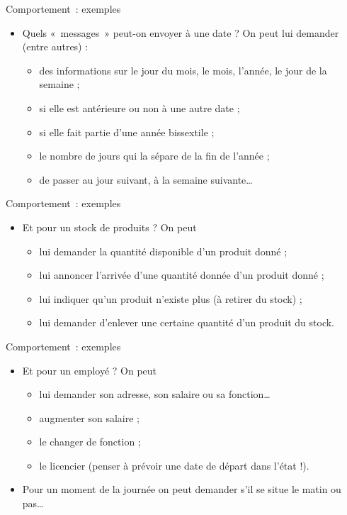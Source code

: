 \begin{frame}{Comportement~: exemples}
	\begin{itemize}
		\item
			Quels «~messages~» peut-on envoyer à une date ? 
			\pause
			On peut lui demander (entre autres) :
			\begin{itemize}
			\item
				des informations sur le jour du mois, le mois, l'année,
				le jour de la semaine ;
			\item
				si elle est antérieure ou non à une autre date ;
			\item
				si elle fait partie d'une année bissextile ;
			\item
				le nombre de jours qui la sépare de la fin de l'année ;
			\item 
				de passer au jour suivant, à la semaine suivante\dots
			\end{itemize}
	\end{itemize}
\end{frame}

\begin{frame}{Comportement~: exemples}
	\begin{itemize}
		\item 
			Et pour un stock de produits ? On peut 
			\pause
			\begin{itemize}
			\item
				lui demander la quantité disponible d'un produit donné ;
			\item
				lui annoncer l'arrivée d'une quantité
				donnée d'un produit donné ;
			\item
				lui indiquer qu'un produit n'existe
				plus (à retirer du stock) ;
			\item 
				lui demander d'enlever une certaine quantité
				d'un produit du stock.
			\end{itemize}
		\end{itemize}
\end{frame}

\begin{frame}{Comportement~: exemples}
	\begin{itemize}
		\item
			Et pour un employé ? On peut
			\pause
			\begin{itemize}
			\item 
				lui demander son adresse, son salaire ou sa fonction\dots
			\item 
				augmenter son salaire ;
			\item 
				le changer de fonction ;
			\item 
				le licencier 
				(penser à prévoir une date de départ dans l'état !).
			\end{itemize}
		\pause
		\item 
			Pour un moment de la journée on peut demander s'il se
			situe le matin ou pas\dots	
		\end{itemize}
\end{frame}


